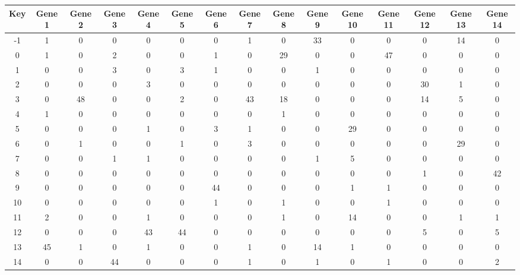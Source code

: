 \begin{tabular}{|c|c|c|c|c|c|c|c|c|c|c|c|c|c|c|}
\hline
Key & Gene 1 & Gene 2 & Gene 3 & Gene 4 & Gene 5 & Gene 6 & Gene 7 & Gene 8 & Gene 9 & Gene 10 & Gene 11 & Gene 12 & Gene 13 & Gene 14 \\
\hline
-1 & 1 & 0 & 0 & 0 & 0 & 0 & 1 & 0 & 33 & 0 & 0 & 0 & 14 & 0 \\
0 & 1 & 0 & 2 & 0 & 0 & 1 & 0 & 29 & 0 & 0 & 47 & 0 & 0 & 0 \\
1 & 0 & 0 & 3 & 0 & 3 & 1 & 0 & 0 & 1 & 0 & 0 & 0 & 0 & 0 \\
2 & 0 & 0 & 0 & 3 & 0 & 0 & 0 & 0 & 0 & 0 & 0 & 30 & 1 & 0 \\
3 & 0 & 48 & 0 & 0 & 2 & 0 & 43 & 18 & 0 & 0 & 0 & 14 & 5 & 0 \\
4 & 1 & 0 & 0 & 0 & 0 & 0 & 0 & 1 & 0 & 0 & 0 & 0 & 0 & 0 \\
5 & 0 & 0 & 0 & 1 & 0 & 3 & 1 & 0 & 0 & 29 & 0 & 0 & 0 & 0 \\
6 & 0 & 1 & 0 & 0 & 1 & 0 & 3 & 0 & 0 & 0 & 0 & 0 & 29 & 0 \\
7 & 0 & 0 & 1 & 1 & 0 & 0 & 0 & 0 & 1 & 5 & 0 & 0 & 0 & 0 \\
8 & 0 & 0 & 0 & 0 & 0 & 0 & 0 & 0 & 0 & 0 & 0 & 1 & 0 & 42 \\
9 & 0 & 0 & 0 & 0 & 0 & 44 & 0 & 0 & 0 & 1 & 1 & 0 & 0 & 0 \\
10 & 0 & 0 & 0 & 0 & 0 & 1 & 0 & 1 & 0 & 0 & 1 & 0 & 0 & 0 \\
11 & 2 & 0 & 0 & 1 & 0 & 0 & 0 & 1 & 0 & 14 & 0 & 0 & 1 & 1 \\
12 & 0 & 0 & 0 & 43 & 44 & 0 & 0 & 0 & 0 & 0 & 0 & 5 & 0 & 5 \\
13 & 45 & 1 & 0 & 1 & 0 & 0 & 1 & 0 & 14 & 1 & 0 & 0 & 0 & 0 \\
14 & 0 & 0 & 44 & 0 & 0 & 0 & 1 & 0 & 1 & 0 & 1 & 0 & 0 & 2 \\
\hline
\end{tabular}
